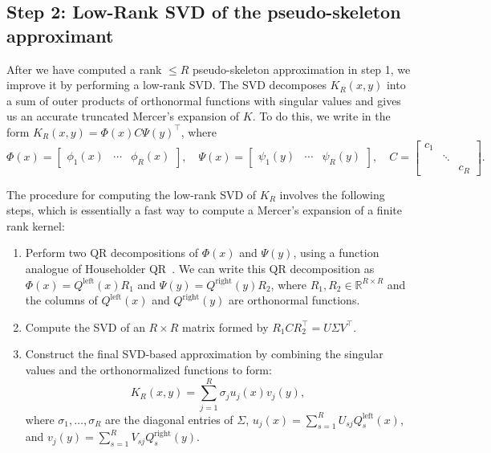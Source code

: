 \documentclass{article}
\begin{document}
\subsection{Step 2: Low-Rank SVD of the pseudo-skeleton approximant}
After we have computed a rank $\leq R$ pseudo-skeleton approximation in step 1, we improve it by performing a low-rank SVD. The SVD decomposes $K_R(x, y)$ into a sum of outer products of orthonormal functions with singular values and gives us an accurate truncated Mercer's expansion of $K$. To do this, we write in the form $K_R(x, y) = \Phi(x) C \Psi(y)^\top$, where
\[
\Phi(x) = \begin{bmatrix}\phi_1(x) & \cdots & \phi_R(x) \end{bmatrix}, \quad \Psi(x) = \begin{bmatrix}\psi_1(y) & \cdots & \psi_R(y) \end{bmatrix}, \quad C = \begin{bmatrix}c_1 \\ & \ddots \\ && c_R \end{bmatrix}.
\]

The procedure for computing the low-rank SVD of $K_R$ involves the following steps, which is essentially a fast way to compute a Mercer's expansion of a finite rank kernel:
\begin{enumerate}[leftmargin=*,noitemsep]
    \item Perform two QR decompositions of $\Phi(x)$ and $\Psi(y)$, using a function analogue of Householder QR~\citep{trefethen2010householder}. We can write this QR decomposition as $\Phi(x) = Q^{\text{left}}(x) R_1$ and $\Psi(y) = Q^{\text{right}}(y)R_2$, where $R_1,R_2\in\mathbb{R}^{R\times R}$ and the columns of $Q^{\text{left}}(x)$ and $Q^{\text{right}}(y)$ are orthonormal functions. 
    \item Compute the SVD of an $R\times R$ matrix formed by $R_1CR_2^\top = U\Sigma V^\top$.
    \item Construct the final SVD-based approximation by combining the singular values and the orthonormalized functions to form:
    \begin{equation} 
    K_R(x, y) = \sum_{j=1}^{R} \sigma_j u_j(x) v_j(y),
    \label{eq:MercerRankR}
    \end{equation} 
    where $\sigma_1,\ldots,\sigma_R$ are the diagonal entries of $\Sigma$, $u_j(x) = \sum_{s=1}^R U_{sj}Q_s^{\text{left}}(x)$, and $v_j(y) = \sum_{s=1}^R V_{sj}Q_s^{\text{right}}(y)$.
\end{enumerate}
\end{document}
